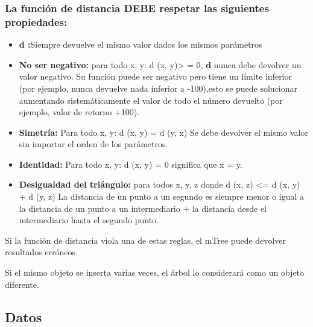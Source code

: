 \documentclass[a4paper]{article}
\begin{document}
\subsubsection*{La función de distancia DEBE respetar las siguientes propiedades: }

\begin{itemize}
    \item \textbf{d :}Siempre devuelve el mismo valor dados los mismos parámetros
    
    \item \textbf{No ser negativo:} para todo x, y: d (x, y)> = 0,\textbf{ d} nunca debe devolver un valor negativo.  Su función puede ser negativo pero tiene un límite inferior (por ejemplo, nunca devuelve nada inferior a -100),esto se puede solucionar aumentando sistemáticamente el valor de todo el número devuelto (por ejemplo, valor de retorno +100).
    
    
    \item\textbf{ Simetría:} Para todo x, y: d (x, y) = d (y, x) Se debe devolver el mismo valor sin importar el orden de los parámetros.
    
    
    \item\textbf{ Identidad:} Para todo x, y: d (x, y) = 0 significa que x = y.
    
    \item\textbf{ Desigualdad del triángulo:} para todos x, y, z donde d (x, z) <= d (x, y) + d (y, z) La distancia de un punto a un segundo es siempre menor o igual a la distancia de un punto a un intermediario + la distancia desde el intermediario hasta el segundo punto.
    
    

\end{itemize}



Si la función de distancia viola una de estas reglas, el mTree puede devolver resultados erróneos.

Si el mismo objeto se inserta varias veces, el árbol lo considerará como un objeto diferente.





\subsection{Datos}
\end{document}
